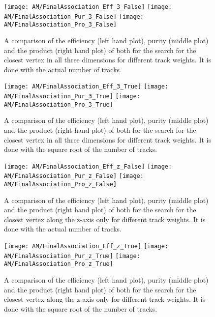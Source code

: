 \begin{figure}[!ht]
  \centering
  \texttt{[image: AM/FinalAssociation\_Eff\_3\_False]}
  \texttt{[image: AM/FinalAssociation\_Pur\_3\_False]}
  \texttt{[image: AM/FinalAssociation\_Pro\_3\_False]}
  \caption[Efficiency, purity and their product for different track weights with the actual number of tracks for the search in three dimensions.]{A comparison of the efficiency (left hand plot), purity (middle plot) and the product (right hand plot) of both for the search for the closest vertex in all three dimensions for different track weights. It is done with the actual number of tracks.\label{plot:AMWFCV3DFalse}}
\end{figure}

\begin{figure}[!ht]
  \centering
  \texttt{[image: AM/FinalAssociation\_Eff\_3\_True]}
  \texttt{[image: AM/FinalAssociation\_Pur\_3\_True]}
  \texttt{[image: AM/FinalAssociation\_Pro\_3\_True]}
  \caption[Efficiency, purity and their product for different track weights with the square root or the number of tracks for the search in three dimensions.]{A comparison of the efficiency (left hand plot), purity (middle plot) and the product (right hand plot) of both for the search for the closest vertex in all three dimensions for different track weights. It is done with the square root of the  number of tracks.\label{plot:AMWFCV3DTrue}}
\end{figure}

\begin{figure}[!ht]
  \centering
  \texttt{[image: AM/FinalAssociation\_Eff\_z\_False]}
  \texttt{[image: AM/FinalAssociation\_Pur\_z\_False]}
  \texttt{[image: AM/FinalAssociation\_Pro\_z\_False]}
  \caption[Efficiency, purity and their product for different track weights with the actual number of tracks for the search along z-axis only.]{A comparison of the efficiency (left hand plot), purity (middle plot) and the product (right hand plot) of both for the search for the closest vertex along the z-axis only for different track weights. It is done with the actual number of tracks.\label{plot:AMWFCVZFalse}}
\end{figure}

\begin{figure}[!ht]
  \centering
  \texttt{[image: AM/FinalAssociation\_Eff\_z\_True]}
  \texttt{[image: AM/FinalAssociation\_Pur\_z\_True]}
  \texttt{[image: AM/FinalAssociation\_Pro\_z\_True]}
  \caption[Efficiency, purity and their product for different track weights with the square root or the number of tracks for the search along z-axis only.]{A comparison of the efficiency (left hand plot), purity (middle plot) and the product (right hand plot) of both for the search for the closest vertex along the z-axis only for different track weights. It is done with the square root of the  number of tracks.\label{plot:AMWFCVZTrue}}
\end{figure}

